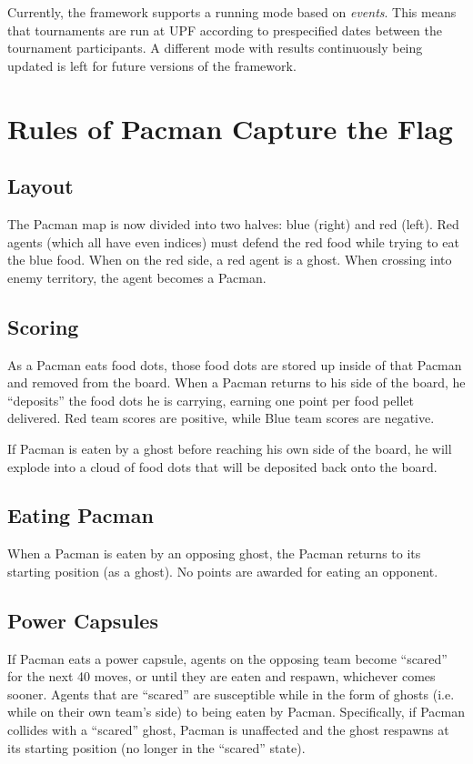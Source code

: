 \documentclass[11pt]{article}
\begin{document}
Currently, the framework supports a running mode based on \emph{events}. This means 
that tournaments are run at UPF according to prespecified dates between the tournament participants. A different mode with results continuously being updated is left for future versions of the framework.



\section{Rules of Pacman Capture the Flag}
\subsection{Layout}
The Pacman map is now divided into two halves: blue (right) and red (left). Red agents (which all have even indices) must defend the red food while trying to eat the blue food. When on the red side, a red agent is a ghost. When crossing into enemy territory, the agent becomes a Pacman.

\subsection{Scoring}
As a Pacman eats food dots, those food dots are stored up inside of that Pacman and removed from the board. When a Pacman returns to his side of the board, he ``deposits'' the food dots he is carrying, earning one point per food pellet delivered. Red team scores are positive, while Blue team scores are negative.

If Pacman is eaten by a ghost before reaching his own side of the board, he will explode into a cloud of food dots that will be deposited back onto the board.

\subsection{Eating Pacman}
When a Pacman is eaten by an opposing ghost, the Pacman returns to its starting position (as a ghost). No points are awarded for eating an opponent.

\subsection{Power Capsules}
If Pacman eats a power capsule, agents on the opposing team become ``scared'' for the next 40 moves, or until they are eaten and respawn, whichever comes sooner. Agents that are ``scared'' are susceptible while in the form of ghosts (i.e. while on their own team's side) to being eaten by Pacman. Specifically, if Pacman collides with a ``scared'' ghost, Pacman is unaffected and the ghost respawns at its starting position (no longer in the ``scared'' state).
\end{document}

